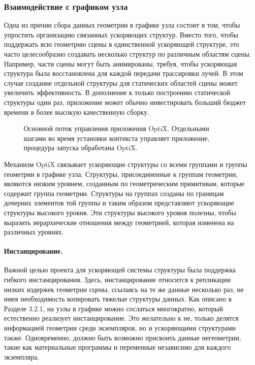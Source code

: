 \subsubsection{Взаимодействие с графиком узла}
Одна из причин сбора данных геометрии в графике узла состоит в том, чтобы упростить организацию связанных ускоряющих структур. Вместо того, чтобы поддержать всю геометрию сцены в единственной ускоряющей структуре, это часто целесообразно создавать несколько структур по различным областям сцены. Например, части сцены могут быть анимированы, требуя, чтобы ускоряющая структура была восстановлена для каждой передачи трассировки лучей. В этом случае создание отдельной структуры для статических областей сцены может увеличить эффективность. В дополнение к только построению статической структуры один раз, приложение может обычно инвестировать больший бюджет времени в более высокую качественную сборку.

\begin{figure}[h!]
\caption{Основной поток управления приложения OptiX. Отдельными шагами во время установки контекста управляет приложение, процедура запуска обработана OptiX.}
\label{fig2}
\end{figure}
  Механизм OptiX связывает ускоряющие структуры со всеми группами и группы геометрии в графике узла. Структуры, присоединенные к группам геометрии, являются низким уровнем, созданным по геометрическим примитивам, которые содержит группа геометрии. Структуры на группах созданы по границам дочерних элементов той группы и таким образом представляют ускоряющие структуры высокого уровня. Эти структуры высокого уровня полезны, чтобы выразить иерархические отношения между геометрией, которая изменена на различных уровнях. 
  
 \paragraph{Инстанцирование.} Важной целью проекта для ускоряющей системы структуры была поддержка гибкого инстанцирования. Здесь, инстанцирование относится к репликации низких издержек геометрии сцены, ссылаясь на те же данные несколько раз, не имея необходимость копировать тяжелые структуры данных. Как описано в Разделе 3.2.1, на узлы в графике можно сослаться многократно, который естественно реализует инстанцирование. Это желательно к не, только делятся информацией геометрии среди экземпляров, но и ускоряющими структурами также. Одновременно, должно быть возможно присвоить данные негеометрии, такие как материальные программы и переменные независимо для каждого экземпляра. 
  
